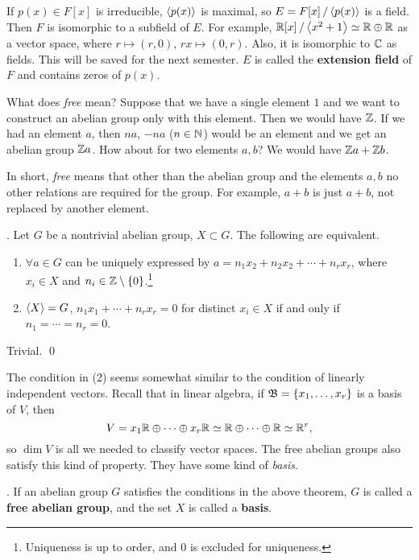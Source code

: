 \rmk If \(p(x) \in F[x]\) is irreducible, \(\left\langle p(x) \right\rangle\) is maximal, so \(E = F[x] \operatorname{/} \left\langle p(x) \right\rangle\) is a field. Then \(F\) is isomorphic to a subfield of \(E\). For example, \(\mathbb{R}[x] \operatorname{/} \left\langle x^2 + 1 \right\rangle \simeq \mathbb{R} \oplus \mathbb{R}\) as a vector space, where \(r \mapsto (r, 0)\), \(rx \mapsto (0, r)\). Also, it is isomorphic to \(\mathbb{C}\) as fields. This will be saved for the next semester. \(E\) is called the \textbf{extension field} of \(F\) and contains zeros of \(p(x)\).

\pagebreak

\setcounter{topic}{37}

What does \textit{free} mean? Suppose that we have a single element \(1\) and we want to construct an abelian group only with this element. Then we would have \(\mathbb{Z}\). If we had an element \(a\), then \(na\), \(-na\) (\(n \in \mathbb{N}\)) would be an element and we get an abelian group \(\mathbb{Z} a\). How about for two elements \(a, b\)? We would have \(\mathbb{Z} a + \mathbb{Z} b\).

In short, \textit{free} means that other than the abelian group and the elements \(a, b\) no other relations are required for the group. For example, \(a + b\) is just \(a + b\), not replaced by another element.

\thm. Let \(G\) be a nontrivial abelian group, \(X \subset G\). The following are equivalent.
\begin{enumerate}
    \item \(\forall a \in G\) can be uniquely expressed by \(a = n_1x_2 + n_2x_2 + \cdots + n_rx_r\), where \(x_i \in X\) and \(n_i \in \mathbb{Z} \setminus \{0\}\).\footnote{Uniqueness is up to order, and 0 is excluded for uniqueness.}
    \item \(\left\langle X \right\rangle = G\), \(n_1x_1 + \cdots + n_rx_r = 0\) for distinct \(x_i \in X\) if and only if \(n_1 = \cdots = n_r = 0\).
\end{enumerate}

\pf Trivial. \qed

\rmk The condition in (2) seems somewhat similar to the condition of linearly independent vectors. Recall that in linear algebra, if \(\mathfrak{B} = \{x_1, \dots, x_r\}\) is a basis of \(V\), then
\[
    V = x_1\mathbb{R} \oplus \cdots \oplus x_r \mathbb{R} \simeq \mathbb{R} \oplus \cdots \oplus \mathbb{R} \simeq \mathbb{R}^r,
\]
so \(\dim V\) is all we needed to classify vector spaces. The free abelian groups also satisfy this kind of property. They have some kind of \textit{basis}.

.  If an abelian group \(G\) satisfies the conditions in the above theorem, \(G\) is called a \textbf{free abelian group}, and the set \(X\) is called a \textbf{basis}.


